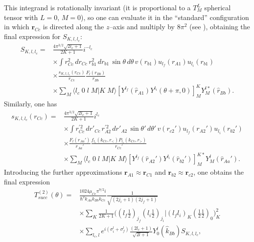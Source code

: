 This integrand is rotationally invariant (it is proportional to a $T_M^L$ spherical tensor with $L=0$, $M=0$), so one can  evaluate it in the ``standard'' configuration  in which $\mathbf{r}_{Cc}$ is directed along the $z$--axis and multiply by $8\pi^2$ (see \cite{Bayman:82}), obtaining the final expression for $S_{K,l,l_c}$:
\begin{equation}\label{eq124}
 \begin{split}
S_{K,l,l_c}=&\frac{4\pi^{3/2}\sqrt{2l_c+1}}{2K+1}i^{-l_c}\\
&\times\int r_{Cc}^2 \, d r_{Cc}\,r_{b1}^2\, d r_{b1} \,\sin\theta\, d\theta \, v(r_{b1}) u_{l_f}(r_{A1})u_{l_i}(r_{b1})\\
& \times \frac{s_{K,l,l_c}(r_{Cc})}{r_{Cc}}\frac{F_l(r_{Bb})}{r_{Bb}}\\
&\times\sum_M \langle l_c \;0\;l\;M|K\;M\rangle \left[ Y ^{l_f} (\hat r_{A1}) Y ^{l_i} (\theta+\pi,0) \right] _{M}^{K}
 Y^{l*}_M (\hat r_{Bb}).
 \end{split}
\end{equation}
Similarly, one has
\begin{equation}\label{eq125}
 \begin{split}
s_{K,l,l_c}(r_{Cc})=&\frac{4\pi^{3/2}\sqrt{2l_c+1}}{2K+1}i^{l_c}\\
&\times\int r_{Cc}^{'2} \, d r'_{Cc}\,r_{A2}^{'2}\, d r'_{A2} \,\sin\theta'\, d\theta' \, v(r_{c2}') u_{l_f}(r_{A2}')u_{l_i}(r_{b2}')  \\
& \times \frac{F_l(r_{Aa}')}{r_{Aa}'}\frac{f_{l_c}(k_{Cc},r_<)P_{l_c}(k_{Cc},r_>)}{r_{Cc}'}\\
&\times\sum_M \langle l_c \;0\;l\;M|K\;M\rangle \left[ Y ^{l_f} (\hat r_{A2}') Y ^{l_i} (\hat r_{b2}') \right] _{M}^{K*}
 Y^{l}_M (\hat r_{Aa}').
 \end{split}
\end{equation}
Introducing  the further approximations $\mathbf{r}_{A1}\approx\mathbf{r}_{C1}$ and $\mathbf{r}_{b2}\approx\mathbf{r}_{c2}$, one obtains the final expression
\begin{equation}\label{eq126}
 \begin{split}
T_{succ}^{(2)}(\theta)=&\frac{1024\mu_{Cc}\pi^{9/2} i}{\hbar^2 k_{Aa}k_{Bb}k_{Cc}}\frac{1}{\sqrt{(2j_i+1)(2j_f+1)}}\\
&\times \sum_{K}\frac{1}{2K+1}
\bigl ( (l_f \tfrac{1}{2})_{j_f} (l_i \tfrac{1}{2})_{j_i} |(l_f l_i)_K (\tfrac{1}{2} \tfrac{1}{2})_0 \bigr )_K ^2\\
&\times \sum_{l_c,l}e^{i(\sigma _i^l+\sigma _f^{l})}\frac{(2l_c+1)}{\sqrt{2l+1}} Y_0^l(\hat k_{Bb})S_{K,l,l_c},
 \end{split}
\end{equation}
